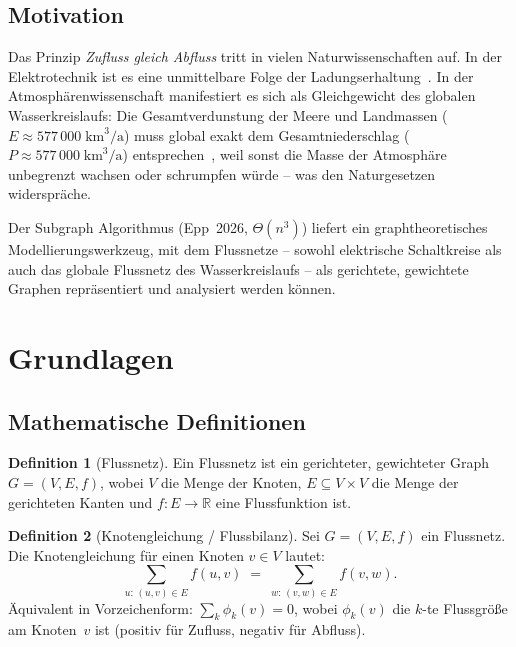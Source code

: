 ﻿\documentclass[a4paper,12pt]{article}
\theoremstyle{definition}
\newtheorem{definition}{Definition}
\begin{document}
\subsection{Motivation}

Das Prinzip \emph{Zufluss gleich Abfluss} tritt in vielen Naturwissen\-schaften
auf. In der Elektrotechnik ist es eine unmittelbare Folge der
Ladungserhaltung~\cite{kirchhoff1845}. In der Atmosphären\-wissenschaft
manifestiert es sich als Gleichgewicht des globalen Wasserkreislaufs: Die
Gesamtverdunstung der Meere und Landmassen ($E \approx 577\,000\;\text{km}^3/\text{a}$)
muss global exakt dem Gesamtniederschlag ($P \approx 577\,000\;\text{km}^3/\text{a}$)
entsprechen~\cite{trenberth2011}, weil sonst die Masse der Atmosphäre
unbegrenzt wachsen oder schrumpfen würde -- was den Naturgesetzen widerspräche.

Der Subgraph Algorithmus (Epp~2026, $\Theta(n^3)$) \cite{epp2026} liefert
ein graphtheoretisches Modellierungs\-werkzeug, mit dem Flussnetze -- sowohl
elektrische Schaltkreise als auch das globale Flussnetz des Wasser\-kreislaufs
-- als gerichtete, gewichtete Graphen repräsentiert und analysiert werden können.

\section{Grundlagen}

\subsection{Mathematische Definitionen}

\begin{definition}[Flussnetz]
  Ein Flussnetz ist ein gerichteter, gewichteter Graph $G = (V, E, f)$, wobei
  $V$ die Menge der Knoten, $E \subseteq V \times V$ die Menge der gerichteten
  Kanten und $f: E \to \mathbb{R}$ eine Flussfunktion ist.
\end{definition}

\begin{definition}[Knotengleichung / Flussbilanz]
  \label{def:knotengleichung}
  Sei $G = (V, E, f)$ ein Flussnetz. Die Knotengleichung für einen Knoten
  $v \in V$ lautet:
  \[
    \sum_{u:\,(u,v)\in E} f(u,v) \;=\; \sum_{w:\,(v,w)\in E} f(v,w).
  \]
  Äquivalent in Vorzeichenform: $\displaystyle\sum_{k} \phi_k(v) = 0$, wobei
  $\phi_k(v)$ die $k$-te Flussgröße am Knoten~$v$ ist
  (positiv für Zufluss, negativ für Abfluss).
\end{definition}
\end{document}
